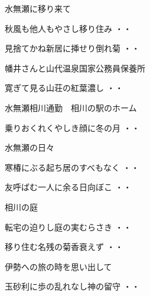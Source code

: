 水無瀬に移り来て
\begin{shiika}秋風も他人もやさし移り住み
\hfill{・・}\end{shiika}
\begin{shiika}見捨てかね新居に挿せり倒れ菊
\hfill{・・}\end{shiika}
\vspace{0.6cm}
幡井さんと山代温泉国家公務員保養所
\begin{shiika}寛ぎて見る山荘の紅葉濃し
\hfill{・・}\end{shiika}
\vspace{0.6cm}
水無瀬相川通勤　相川の駅のホーム
\begin{shiika}乗りおくれくやしき顔に冬の月
\hfill{・・}\end{shiika}
\vspace{0.6cm}
水無瀬の日々
\begin{shiika}寒椿にぶる起ち居のすべもなく
\hfill{・・}\end{shiika}
\vspace{0.6cm}
\begin{shiika}友呼ばむ一人に余る日向ぼこ
\hfill{・・}\end{shiika}
\newpage\newpage
\vspace{0.6cm}
相川の庭
\begin{shiika}転宅の迫りし庭の実むらさき
\hfill{・・}\end{shiika}
\begin{shiika}移り住む名残の菊香衰えず
\hfill{・・}\end{shiika}
\vspace{0.6cm}
伊勢への旅の時を思い出して
\begin{shiika}玉砂利に歩の乱れなし神の留守
\hfill{・・}\end{shiika}
\vspace{0.6cm}

